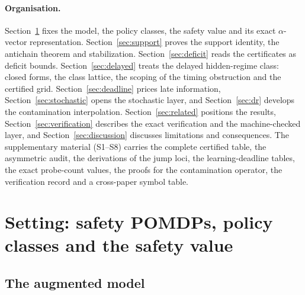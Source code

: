 \documentclass[11pt,a4paper]{article}
\theoremstyle{plain}
\theoremstyle{definition}
\theoremstyle{remark}
\begin{document}
\paragraph{Organisation.}
Section~\ref{sec:setting} fixes the model, the policy classes, the safety value and its exact $\alpha$-vector representation. Section~\ref{sec:support} proves the support identity, the antichain theorem and stabilization. Section~\ref{sec:deficit} reads the certificates as deficit bounds. Section~\ref{sec:delayed} treats the delayed hidden-regime class: closed forms, the class lattice, the scoping of the timing obstruction and the certified grid. Section~\ref{sec:deadline} prices late information, Section~\ref{sec:stochastic} opens the stochastic layer, and Section~\ref{sec:dr} develops the contamination interpolation. Section~\ref{sec:related} positions the results, Section~\ref{sec:verification} describes the exact verification and the machine-checked layer, and Section~\ref{sec:discussion} discusses limitations and consequences. The supplementary material (S1--S8) carries the complete certified table, the asymmetric audit, the derivations of the jump loci, the learning-deadline tables, the exact probe-count values, the proofs for the contamination operator, the verification record and a cross-paper symbol table.
\section{Setting: safety POMDPs, policy classes and the safety value}\label{sec:setting}

\subsection{The augmented model}
\end{document}
